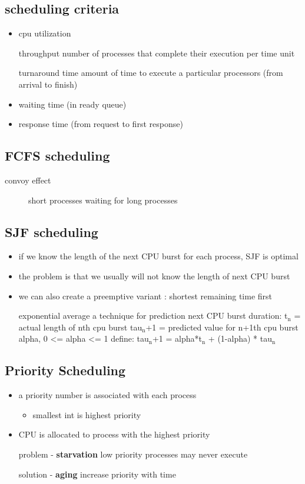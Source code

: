 \documentclass[11pt]{article}
\begin{document}
\subsection{scheduling criteria}
\label{sec:org21a5613}
\begin{itemize}
\item cpu utilization
\item[{throughput}] number of processes that complete their execution per time unit
\item[{turnaround time}] amount of time to execute a particular processors (from arrival to finish)
\item waiting time (in ready queue)
\item response time (from request to first response)
\end{itemize}
\subsection{FCFS scheduling}
\label{sec:org7834760}
\begin{description}
\item[{convoy effect}] short processes waiting for long processes
\end{description}
\subsection{SJF scheduling}
\label{sec:org3da4c92}
\begin{itemize}
\item if we know the length of the next CPU burst for each process, SJF is optimal
\item the problem is that we usually will not know the length of next CPU burst
\item we can also create a preemptive variant : shortest remaining time first
\item[{exponential average}] a technique for prediction next CPU burst duration:
t\(_{\text{n}}\) = actual length of nth cpu burst
tau\(_{\text{n}}\)+1 = predicted value for n+1th cpu burst
alpha, 0 <= alpha <= 1
define: tau\(_{\text{n}}\)+1 = alpha*t\(_{\text{n}}\) + (1-alpha) * tau\(_{\text{n}}\)
\end{itemize}
\subsection{Priority Scheduling}
\label{sec:org4361a65}
\begin{itemize}
\item a priority number is associated with each process
\begin{itemize}
\item smallest int is highest priority
\end{itemize}
\item CPU is allocated to process with the highest priority
\item[{problem - \textbf{starvation}}] low priority processes may never execute
\item[{solution - \textbf{aging}}] increase priority with time
\end{itemize}
\end{document}
